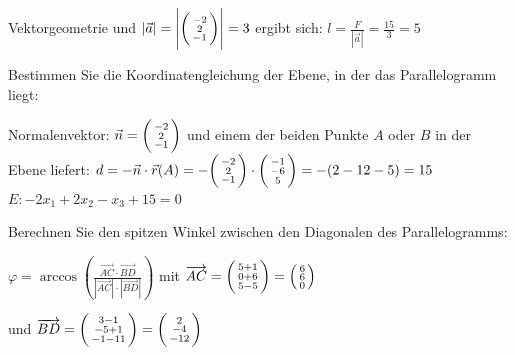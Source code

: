 \begin{example2}[breakable]{Vektorgeometrie}
    und $|\vec{a}|=\left|\begin{psmallmatrix}-2 \\ 2 \\ -1\end{psmallmatrix}\right|=3$
    ergibt sich: $l=\frac{F}{|\vec{a}|}=\frac{15}{3}=5$

    \vspace{3mm}

    Bestimmen Sie die Koordinatengleichung der Ebene, in der das Parallelogramm liegt:

    Normalenvektor: $\vec{n}=\begin{psmallmatrix}-2 \\ 2 \\ -1\end{psmallmatrix}$ und einem der beiden Punkte $A$ oder $B$ in der Ebene liefert: $d=-\vec{n} \cdot \vec{r}(A)=-\begin{psmallmatrix}-2 \\ 2 \\ -1\end{psmallmatrix} \cdot\begin{psmallmatrix}-1 \\ -6 \\ 5\end{psmallmatrix}=-(2-12-5)=15$ $E:-2 x_{1}+2 x_{2}-x_{3}+15=0$

    \vspace{3mm}

    Berechnen Sie den spitzen Winkel zwischen den Diagonalen des Parallelogramms:

    $\varphi=\arccos \left(\frac{\overrightarrow{A C} \cdot \overrightarrow{B D}}{|\overrightarrow{A C}| \cdot|\overrightarrow{B D}|}\right)$ mit $\overrightarrow{A C}=\begin{psmallmatrix}5+1 \\ 0+6 \\ 5-5\end{psmallmatrix}=\begin{psmallmatrix}6 \\ 6 \\ 0\end{psmallmatrix}$ 
    
    und $\overrightarrow{B D}=\begin{psmallmatrix}3-1 \\ -5+1 \\ -1-11\end{psmallmatrix}=\begin{psmallmatrix}2 \\ -4 \\ -12\end{psmallmatrix}$


\end{example2}

